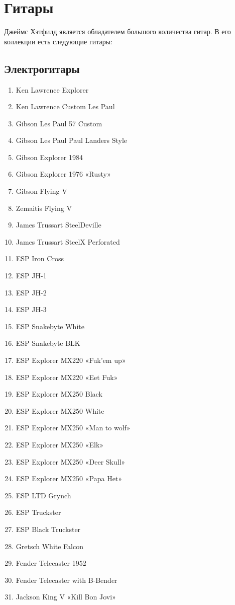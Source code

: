 \documentclass[a4paper,12pt,leqno]{article}
\theoremstyle{plain} %
\theoremstyle{definition} %
\theoremstyle{remark} %
\begin{document}
\section{Гитары}

Джеймс Хэтфилд является обладателем большого количества гитар. В его коллекции есть следующие гитары:

\subsection{Электрогитары}

\begin{enumerate}
	\item Ken Lawrence Explorer
	\item Ken Lawrence Custom Les Paul
	\item Gibson Les Paul 57 Custom
	\item Gibson Les Paul Paul Landers Style
	\item Gibson Explorer 1984
	\item Gibson Explorer 1976 «Rusty»
	\item Gibson Flying V
	\item Zemaitis Flying V
	\item James Trussart SteelDeville
	\item James Trussart SteelX Perforated
	\item ESP Iron Cross
	\item ESP JH-1
	\item ESP JH-2
	\item ESP JH-3
	\item ESP Snakebyte White
	\item ESP Snakebyte BLK
	\item ESP Explorer MX220 «Fuk’em up»
	\item ESP Explorer MX220 «Eet Fuk»
	\item ESP Explorer MX250 Black
	\item ESP Explorer MX250 White
	\item ESP Explorer MX250 «Man to wolf»
	\item ESP Explorer MX250 «Elk»
	\item ESP Explorer MX250 «Deer Skull»
	\item ESP Explorer MX250 «Papa Het»
	\item ESP LTD Grynch
	\item ESP Truckster
	\item ESP Black Truckster
	\item Gretsch White Falcon
	\item Fender Telecaster 1952
	\item Fender Telecaster with B-Bender 
	\item Jackson King V «Kill Bon Jovi»
\end{enumerate}
\end{document}
